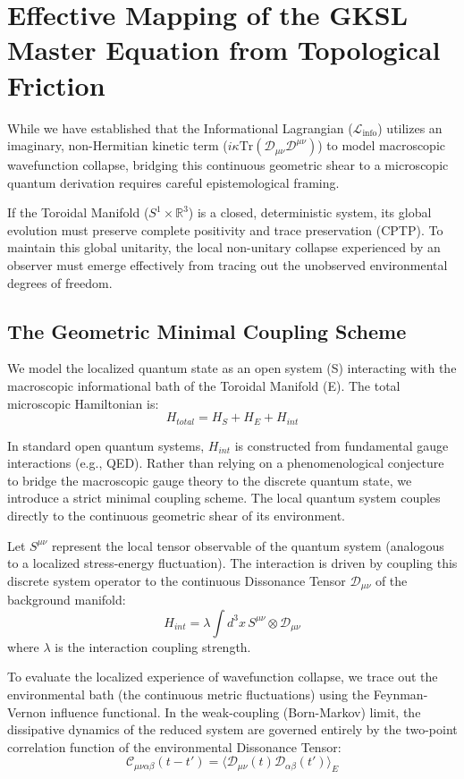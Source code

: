 \documentclass[12pt,openany]{book}
\theoremstyle{plain}
\theoremstyle{definition}
\theoremstyle{remark}
\begin{document}
\section{Effective Mapping of the GKSL Master Equation from Topological Friction}

While we have established that the Informational Lagrangian ($\mathcal{L}_{\text{info}}$) utilizes an imaginary, non-Hermitian kinetic term ($i \kappa \text{Tr}(\mathcal{D}_{\mu\nu}\mathcal{D}^{\mu\nu})$) to model macroscopic wavefunction collapse, bridging this continuous geometric shear to a microscopic quantum derivation requires careful epistemological framing.

If the Toroidal Manifold ($S^1 \times \mathbb{R}^3$) is a closed, deterministic system, its global evolution must preserve complete positivity and trace preservation (CPTP). To maintain this global unitarity, the local non-unitary collapse experienced by an observer must emerge effectively from tracing out the unobserved environmental degrees of freedom.

\subsection{The Geometric Minimal Coupling Scheme}

We model the localized quantum state as an open system (S) interacting with the macroscopic informational bath of the Toroidal Manifold (E). The total microscopic Hamiltonian is:
$$ H_{total} = H_S + H_E + H_{int} $$

In standard open quantum systems, $H_{int}$ is constructed from fundamental gauge interactions (e.g., QED). Rather than relying on a phenomenological conjecture to bridge the macroscopic gauge theory to the discrete quantum state, we introduce a strict minimal coupling scheme. The local quantum system couples directly to the continuous geometric shear of its environment. 

Let $S^{\mu\nu}$ represent the local tensor observable of the quantum system (analogous to a localized stress-energy fluctuation). The interaction is driven by coupling this discrete system operator to the continuous Dissonance Tensor $\mathcal{D}_{\mu\nu}$ of the background manifold:
$$ H_{int} = \lambda \int d^3x \, S^{\mu\nu} \otimes \mathcal{D}_{\mu\nu} $$
where $\lambda$ is the interaction coupling strength.

To evaluate the localized experience of wavefunction collapse, we trace out the environmental bath (the continuous metric fluctuations) using the Feynman-Vernon influence functional. In the weak-coupling (Born-Markov) limit, the dissipative dynamics of the reduced system are governed entirely by the two-point correlation function of the environmental Dissonance Tensor:
$$ \mathcal{C}_{\mu\nu\alpha\beta}(t - t') = \langle \mathcal{D}_{\mu\nu}(t) \mathcal{D}_{\alpha\beta}(t') \rangle_E $$
\end{document}
